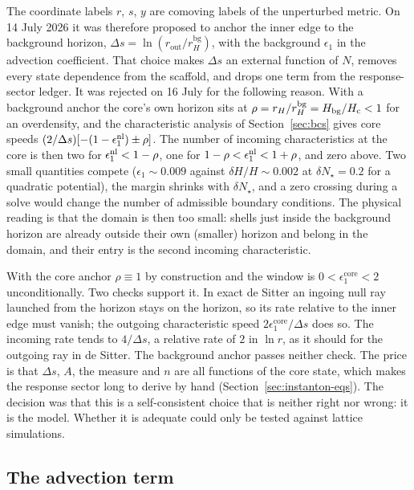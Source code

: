 \documentclass[a4paper,11pt]{article}
\newcommand{\semibold}[1]{{\fontseries{b}\selectfont{#1}}}
\newenvironment{panel}{\begin{tcolorbox}[enhanced,breakable,colback=gray!10,colframe=gray!30]\small}{\end{tcolorbox}}
\newcommand{\Ny}{N}                          %
\newcommand{\dNstar}{\delta N_\star}         %
\newcommand{\epsSR}{\epsilon_1}              %
\newcommand{\Hub}{H}                         %
\newcommand{\rad}{r}                         %
\newcommand{\yco}{y}                         %
\newcommand{\rout}{\rad_{\mathrm{out}}}      %
\newcommand{\rH}{\rad_H}                     %
\newcommand{\Deltas}{\Delta s}                %
\newcommand{\epscore}{\epsSR^{\mathrm{core}}} %
\newcommand{\advcoef}{A}                     %
\newcommand{\ncount}{n}                      %
\newcommand{\rHbg}{\rad_H^{\mathrm{bg}}}      %
\newcommand{\core}{\mathrm{c}}                %
\begin{document}
\begin{panel}
\semibold{Core anchor versus background anchor.} The coordinate labels
$\rad$, $s$, $\yco$ are comoving labels of the unperturbed metric. On
14 July 2026 it was therefore proposed to anchor the inner edge to the
background horizon, $\Deltas = \ln(\rout/\rHbg)$, with the background
$\epsSR$ in the advection coefficient. That choice makes $\Deltas$ an
external function of $\Ny$, removes every state dependence from the
scaffold, and drops one term from the response-sector ledger. It was
rejected on 16 July for the following reason. With a background anchor
the core's own horizon sits at $\rho = \rH/\rHbg = \Hub_{\rm bg}/\Hub_{\core} < 1$
for an overdensity, and the characteristic analysis of
Section~\ref{sec:bcs} gives core speeds $(2/\Deltas)[-(1-\epsSR^{\rm nl}) \pm \rho]$.
The number of incoming characteristics at the core is then two for
$\epsSR^{\rm nl} < 1-\rho$, one for $1-\rho < \epsSR^{\rm nl} < 1+\rho$, and zero
above. Two small quantities compete ($\epsSR \sim 0.009$ against
$\delta\Hub/\Hub \sim 0.002$ at $\dNstar = 0.2$ for a quadratic potential),
the margin shrinks with $\dNstar$, and a zero crossing during a solve would
change the number of admissible boundary conditions. The physical reading
is that the domain is then too small: shells just inside the background
horizon are already outside their own (smaller) horizon and belong in the
domain, and their entry is the second incoming characteristic.

With the core anchor $\rho\equiv1$ by construction and the window is
$0<\epscore<2$ unconditionally. Two checks support it. In exact de Sitter
an ingoing null ray launched from the horizon stays on the horizon, so its
rate relative to the inner edge must vanish; the outgoing characteristic
speed $2\epscore/\Deltas$ does so. The incoming rate tends to $4/\Deltas$,
a relative rate of $2$ in $\ln\rad$, as it should for the outgoing ray in
de Sitter. The background anchor passes neither check. The price is that
$\Deltas$, $\advcoef$, the measure and $\ncount$ are all functions of the
core state, which makes the response sector long to derive by hand
(Section~\ref{sec:instanton-eqs}). The decision was that this is a
self-consistent choice that is neither right nor wrong: it is the model.
Whether it is adequate could only be tested against lattice simulations.
\end{panel}

\subsection{The advection term}
\label{sec:advection}
\end{document}
